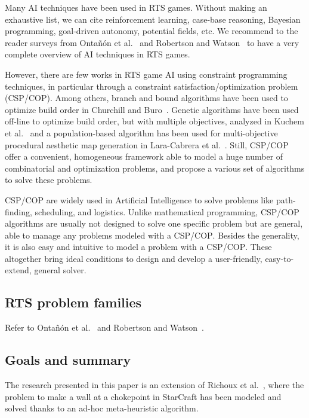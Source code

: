 \documentclass[journal]{IEEEtran}
\newcommand{\csp}{\textsc{CSP}\xspace}
\newcommand{\cop}{\textsc{COP}\xspace}
\begin{document}
Many AI  techniques have  been used  in RTS  games. Without  making an
exhaustive  list,  we  can   cite  reinforcement  learning,  case-base
reasoning,  Bayesian  programming,   goal-driven  autonomy,  potential
fields, etc. We  recommend to the reader  surveys from Onta{\~n}{\'o}n
et       al.~\cite{OntanonSURCM13}       and       Robertson       and
Watson~\cite{RobertsonW14}  to have  a  very complete  overview of  AI
techniques in RTS games.

However, there are few works in RTS game AI using constraint programming
techniques,      in      particular     through      a      constraint
satisfaction/optimization problem  (\csp/\cop).  Among  others, branch
and  bound  algorithms have  been  used  to  optimize build  order  in
Churchill and Buro~\cite{ChurchillB11}.   Genetic algorithms have been
used off-line to  optimize build order, but  with multiple objectives,
analyzed  in Kuchem  et al.~\cite{KuchemPR13}  and a  population-based
algorithm has  been used for multi-objective  procedural aesthetic map
generation in  Lara-Cabrera et al.~\cite{LaraCF14}.   Still, \csp/\cop
offer a convenient, homogeneous framework  able to model a huge number
of combinatorial and optimization problems,  and propose a various set
of algorithms to solve these problems.

\csp/\cop are widely used in Artificial Intelligence to solve problems
like  path-finding, scheduling,  and  logistics.  Unlike  mathematical
programming, \csp/\cop  algorithms are  usually not designed  to solve
one  specific problem  but are  general, able  to manage  any problems
modeled with a \csp/\cop. Besides the  generality, it is also easy and
intuitive to model a problem  with a \csp/\cop. These altogether bring
ideal   conditions   to   design    and   develop   a   user-friendly,
easy-to-extend, general solver.



\subsection{RTS problem families}

Refer  to Onta{\~n}{\'o}n  et al.~\cite{OntanonSURCM13}  and Robertson
and Watson~\cite{RobertsonW14}.


\subsection{Goals and summary}

The research  presented in this  paper is  an extension of  Richoux et
al.~\cite{RichouxUO14},  where  the  problem  to  make  a  wall  at  a
chokepoint  in StarCraft  has been  modeled  and solved  thanks to  an
ad-hoc meta-heuristic algorithm.
\end{document}
